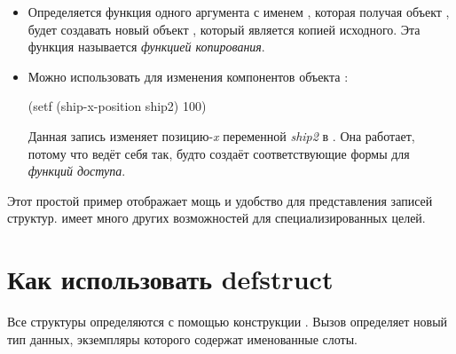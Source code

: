 \begin{itemize}
\item Определяется функция одного аргумента с именем ,
  которая получая объект , будет создавать новый объект
  , который является копией исходного.  Эта функция
  называется \emph{функцией копирования}.

\item Можно использовать  для изменения компонентов объекта
  :
  \begin{lisp}
    (setf (ship-x-position ship2) 100)
  \end{lisp}
  Данная запись изменяет позицию-\emph{x} переменной \emph{ship2} в
  .  Она работает, потому что  ведёт себя так,
  будто создаёт соответствующие  формы для \emph{функций
    доступа}.
\end{itemize}

Этот простой пример отображает мощь и удобство  для представления
записей структур.
 имеет много других возможностей для специализированных целей.

\section{Как использовать defstruct}

Все структуры определяются с помощью конструкции .
Вызов  определяет новый тип данных, экземпляры которого содержат
именованные слоты.


